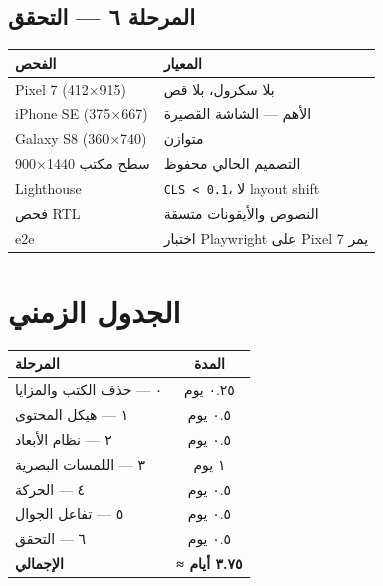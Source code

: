 \documentclass[11pt]{article}
\newcommand{\code}[1]{\textcolor{darkbg}{\texttt{\small #1}}}
\begin{document}
\subsection{المرحلة ٦ — التحقق}
\begin{center}
\renewcommand{\arraystretch}{1.3}
\begin{tabular}{@{}p{6cm} p{6cm}@{}}
\toprule
\textbf{الفحص} & \textbf{المعيار} \\
\midrule
Pixel 7 (412×915) & بلا سكرول، بلا قص \\
iPhone SE (375×667) & الأهم — الشاشة القصيرة \\
Galaxy S8 (360×740) & متوازن \\
سطح مكتب 1440×900 & التصميم الحالي محفوظ \\
Lighthouse & \code{CLS < 0.1}، لا layout shift \\
فحص RTL & النصوص والأيقونات متسقة \\
e2e & اختبار Playwright على Pixel 7 يمر \\
\bottomrule
\end{tabular}
\end{center}

\section{الجدول الزمني}
\begin{center}
\renewcommand{\arraystretch}{1.3}
\begin{tabular}{@{}p{8cm} c@{}}
\toprule
\textbf{المرحلة} & \textbf{المدة} \\
\midrule
٠ — حذف الكتب والمزايا & ٠.٢٥ يوم \\
١ — هيكل المحتوى & ٠.٥ يوم \\
٢ — نظام الأبعاد & ٠.٥ يوم \\
٣ — اللمسات البصرية & ١ يوم \\
٤ — الحركة & ٠.٥ يوم \\
٥ — تفاعل الجوال & ٠.٥ يوم \\
٦ — التحقق & ٠.٥ يوم \\
\midrule
\textbf{الإجمالي} & \textbf{≈ ٣.٧٥ أيام} \\
\bottomrule
\end{tabular}
\end{center}

\end{document}
